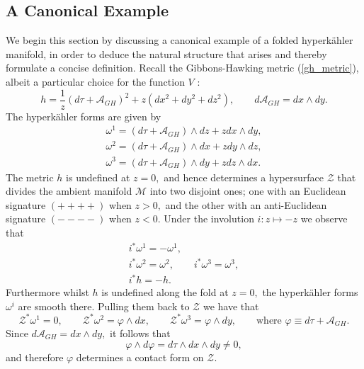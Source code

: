 \documentclass[a4paper,12pt, onecolumn, notitlepage]{article}
\theoremstyle{definition}
\theoremstyle{remark}
\newcommand{\w}{\omega}
\newcommand{\HK}{hyperk\"ahler }
\newcommand{\vp}{\varphi}
\begin{document}
\subsection{A Canonical Example}
We begin this section by discussing a canonical example of a folded \HK manifold, in order to deduce the natural structure that arises and thereby formulate a concise definition. Recall the Gibbons-Hawking metric (\ref{gh_metric}), albeit a particular choice for the function $V$ \cite{hitchin_2015}:
\begin{equation}
	h = \frac{1}{z}(d\tau + \mathcal{A}_{GH})^{2} + z(dx^{2} + dy^{2} + dz^{2}), \qquad d\mathcal{A}_{GH} = dx\wedge dy.
\end{equation} 
The \HK forms are given by
\begin{subequations}
	\begin{align}
	\w^{1} = (d\tau+\mathcal{A}_{GH})\wedge dz + z dx\wedge dy,\\
	\w^{2} = (d\tau+\mathcal{A}_{GH})\wedge dx + z dy\wedge dz,\\
	\w^{3} = (d\tau+\mathcal{A}_{GH})\wedge dy + z dz\wedge dx.
	\end{align}
\end{subequations}
The metric $h$ is undefined at $z=0,$ and hence determines a hypersurface $\mathcal{Z}$ that divides the ambient manifold $\mathcal{M}$ into two disjoint ones; one with an Euclidean signature $(++++)$ when $z>0,$ and the other with an anti-Euclidean signature $(----)$ when $z<0.$ Under the involution $i:z\mapsto-z$ we observe that
\begin{subequations}
	\begin{gather}
	\label{hk_involution}
	i^{\ast}\w^{1} = -\w^{1},\\
	i^{\ast}\w^{2} = \w^{2},\qquad
	i^{\ast}\w^{3} = \w^{3},\\
	i^{\ast}h = -h.
	\end{gather}
\end{subequations}
Furthermore whilst $h$ is undefined along the fold at $z=0,$ the \HK forms $\w^{i}$ are smooth there. Pulling them back to $\mathcal{Z}$ we have that
\begin{equation}
	\label{pullback_GH}
	\mathcal{Z}^{\ast}\w^{1} = 0,\qquad \mathcal{Z}^{\ast}\w^{2} = \vp\wedge dx,\qquad \mathcal{Z}^{\ast}\w^{3} = \vp\wedge dy,\qquad \text{where } \vp\equiv d\tau + \mathcal{A}_{GH}.
\end{equation}
Since $d\mathcal{A}_{GH} = dx\wedge dy,$ it follows that
\begin{equation}
	\label{contact}
	\vp\wedge d\vp = d\tau\wedge dx \wedge dy \neq 0,
\end{equation}
	and therefore $\vp$ determines a contact form on  $\mathcal{Z}.$
	
\end{document}
